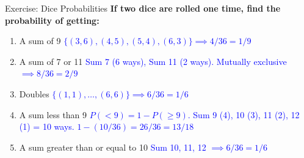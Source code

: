 \documentclass[aspectratio=169]{beamer}
\begin{document}
\begin{frame}{Exercise: Dice Probabilities}
    \textbf{If two dice are rolled one time, find the probability of getting:}
    \vspace{0.2cm}
    
    \begin{enumerate}
        \item A sum of 9 \pause
        \newline \textcolor{blue}{$\{(3,6), (4,5), (5,4), (6,3)\} \implies 4/36 = 1/9$} \pause
        
        \item A sum of 7 or 11 \pause
        \newline \textcolor{blue}{Sum 7 (6 ways), Sum 11 (2 ways). Mutually exclusive $\implies 8/36 = 2/9$} \pause
        
        \item Doubles \pause
        \newline \textcolor{blue}{$\{(1,1), \dots, (6,6)\} \implies 6/36 = 1/6$} \pause
        
        \item A sum less than 9 \pause
        \newline \textcolor{blue}{$P(<9) = 1 - P(\geq 9)$. Sum 9 (4), 10 (3), 11 (2), 12 (1) = 10 ways.}
        \newline \textcolor{blue}{$1 - (10/36) = 26/36 = 13/18$} \pause
        
        \item A sum greater than or equal to 10 \pause
        \newline \textcolor{blue}{Sum 10, 11, 12 $\implies 6/36 = 1/6$}
    \end{enumerate}
\end{frame}
\end{document}
